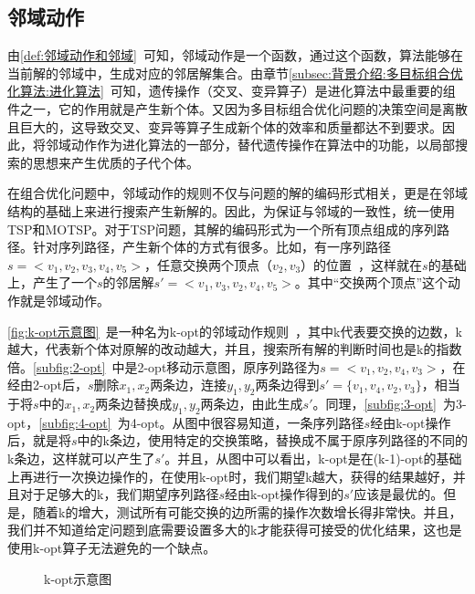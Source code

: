 \subsection{邻域动作}
\label{subsec:背景介绍:局部搜索:邻域动作}
由\autoref{def:邻域动作和邻域}~可知，邻域动作是一个函数，通过这个函数，算法能够在当前解的邻域中，生成对应的邻居解集合。由章节\ref{subsec:背景介绍:多目标组合优化算法:进化算法}~可知，遗传操作（交叉、变异算子）是进化算法中最重要的组件之一，它的作用就是产生新个体。又因为多目标组合优化问题的决策空间是离散且巨大的，这导致交叉、变异等算子生成新个体的效率和质量都达不到要求。因此，将邻域动作作为进化算法的一部分，替代遗传操作在算法中的功能，以局部搜索的思想来产生优质的子代个体。
\par
在组合优化问题中，邻域动作的规则不仅与问题的解的编码形式相关，更是在邻域结构的基础上来进行搜索产生新解的。因此，为保证与邻域的一致性，统一使用TSP和MOTSP。对于TSP问题，其解的编码形式为一个所有顶点组成的序列路径。针对序列路径，产生新个体的方式有很多。比如，有一序列路径$s = <v_1, v_2, v_3, v_4, v_5>$，任意交换两个顶点（$v_2, v_3$）的位置\cite{borges1998basis}~，这样就在$s$的基础上，产生了一个$s$的邻居解$s' = <v_1, v_3, v_2, v_4, v_5>$。其中“交换两个顶点”这个动作就是邻域动作。
\par
\autoref{fig:k-opt示意图}~是一种名为k-opt的邻域动作规则\cite{helsgaun2006effective}~，其中k代表要交换的边数，k越大，代表新个体对原解的改动越大，并且，搜索所有解的判断时间也是k的指数倍。\autoref{subfig:2-opt}~中是2-opt移动示意图，原序列路径为$s=<v_1, v_2, v_4, v_3>$，在经由2-opt后，$s$删除$x_1, x_2$两条边，连接$y_1, y_2$两条边得到$s'=\{ v_1, v_4, v_2, v_3 \}$，相当于将$s$中的$x_1, x_2$两条边替换成$y_1, y_2$两条边，由此生成$s'$。同理，\autoref{subfig:3-opt}~为3-opt，\autoref{subfig:4-opt}~为4-opt。从图中很容易知道，一条序列路径$s$经由k-opt操作后，就是将$s$中的k条边，使用特定的交换策略，替换成不属于原序列路径的不同的k条边，这样就可以产生了$s'$。并且，从图中可以看出，k-opt是在(k-1)-opt的基础上再进行一次换边操作的，在使用k-opt时，我们期望k越大，获得的结果越好，并且对于足够大的k，我们期望序列路径$s$经由k-opt操作得到的$s'$应该是最优的。但是，随着k的增大，测试所有可能交换的边所需的操作次数增长得非常快。并且，我们并不知道给定问题到底需要设置多大的k才能获得可接受的优化结果，这也是使用k-opt算子无法避免的一个缺点。
\begin{figure}[htb]
    \quad
    \quad
    \caption[k-opt示意图]{k-opt示意图}
    \label{fig:k-opt示意图}
\end{figure}

